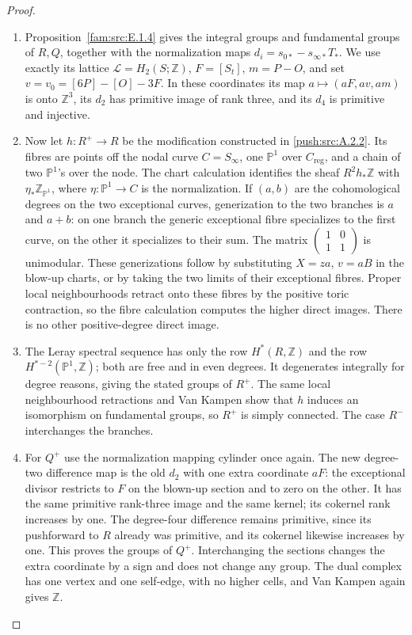 \begin{proof}
\begin{enumerate}[label=\arabic*.,leftmargin=*]
\item Proposition~\ref{fam:src:E.1.4} gives the integral groups and fundamental groups of $R,Q$, together with the normalization maps $d_i=s_{0*}-s_{\infty*}T_*$. We use exactly its lattice $\mathcal L=H_2(S;\mathbb Z)$, $F=[S_t]$, $m=P-O$, and set $v=v_0=[6P]-[O]-3F$. In these coordinates its map $a\mapsto(aF,av,am)$ is onto $\mathbb Z^3$, its $d_2$ has primitive image of rank three, and its $d_4$ is primitive and injective.

\item Now let $h:R^+\to R$ be the modification constructed in \ref{push:src:A.2.2}.
Its fibres are points off the nodal curve $C=S_\infty$, one
$\mathbb P^1$ over $C_{\mathrm{reg}}$, and a chain of two
$\mathbb P^1$'s over the node. The chart calculation identifies
the sheaf $R^2h_*\mathbb Z$ with
$\eta_*\mathbb Z_{\mathbb P^1}$, where
$\eta:\mathbb P^1\to C$ is the normalization. If $(a,b)$ are the cohomological
degrees on the two exceptional curves, generization to the
two branches is $a$ and $a+b$: on one branch the generic
exceptional fibre specializes to the first curve, on the
other it specializes to their sum. The matrix
$\left(\begin{smallmatrix}1&0\\1&1\end{smallmatrix}\right)$
is unimodular. These generizations follow by substituting
$X=za$, $v=aB$ in the blow-up charts, or by taking the two
limits of their exceptional fibres. Proper local neighbourhoods
retract onto these fibres by the positive toric contraction,
so the fibre calculation computes the higher direct images.
There is no other positive-degree direct image.

\item The Leray spectral sequence has only the row $H^*(R,\mathbb Z)$
and the row $H^{*-2}(\mathbb P^1,\mathbb Z)$; both are free
and in even degrees. It degenerates integrally for degree
reasons, giving the stated groups of $R^+$. The same local
neighbourhood retractions and Van Kampen show that $h$ induces
an isomorphism on fundamental groups, so $R^+$ is simply
connected. The case $R^-$ interchanges the branches.

\item For $Q^+$ use the normalization mapping cylinder once again.
The new degree-two difference map is the old $d_2$ with
one extra coordinate $aF$: the exceptional divisor restricts
to $F$ on the blown-up section and to zero on the other.
It has the same primitive rank-three image and the same
kernel; its cokernel rank increases by one. The degree-four
difference remains primitive, since its pushforward to $R$
already was primitive, and its cokernel likewise increases
by one. This proves the groups of $Q^+$. Interchanging the
sections changes the extra coordinate by a sign and does
not change any group. The dual complex has
one vertex and one self-edge, with no higher cells, and
Van Kampen again gives $\mathbb Z$.


\end{enumerate}
\end{proof}
